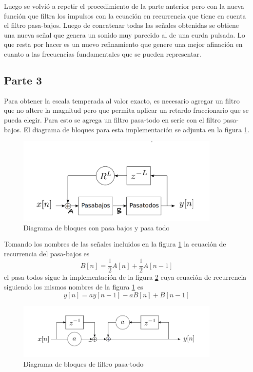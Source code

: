 \documentclass[a4paper]{article}
\begin{document}
\newline
Luego se volvió a repetir el procedimiento de la parte anterior pero con la nueva función que filtra los impulsos con la ecuación en recurrencia que tiene en cuenta el filtro pasa-bajos.
\newline
Luego de concatenar todas las señales obtenidas se obtiene una nueva señal que genera un sonido muy parecido al de una curda pulsada. Lo que resta por hacer es un nuevo refinamiento que genere una mejor afinación en cuanto a las frecuencias fundamentales que se pueden representar. 

\subsection{Parte 3}
Para obtener la escala temperada al valor exacto, es necesario agregar un filtro que no altere la magnitud pero que permita aplicar un retardo fraccionario que se pueda elegir. Para esto se agrega un filtro pasa-todo en serie con el filtro pasa-bajos. El diagrama de bloques para esta implementación se adjunta en la figura \ref{bloquesfinal}.

\begin{figure}[h!]
\centering
\includegraphics[width=0.9\textwidth]{final.png}
\caption{Diagrama de bloques con pasa bajos y pasa todo \cite{of8}}
\label{bloquesfinal}
\end{figure}

\newline
Tomando los nombres de las señales incluidos en la figura \ref{bloquesfinal} la ecuación de recurrencia del pasa-bajos es
$$
B[n] = \frac{1}{2}A[n]+\frac{1}{2}A[n-1] 
$$
el pasa-todos sigue la implementación de la figura \ref{todos} cuya ecuación de recurrencia siguiendo los mismos nombres de la figura \ref{bloquesfinal} es
$$
y[n] = ay[n-1]-aB[n]+B[n-1]
$$

\begin{figure}[h!]
\centering
\includegraphics[width=0.9\textwidth]{todos.png}
\caption{Diagrama de bloques de filtro pasa-todo \cite{of8}}
\label{todos}
\end{figure}
\end{document}
